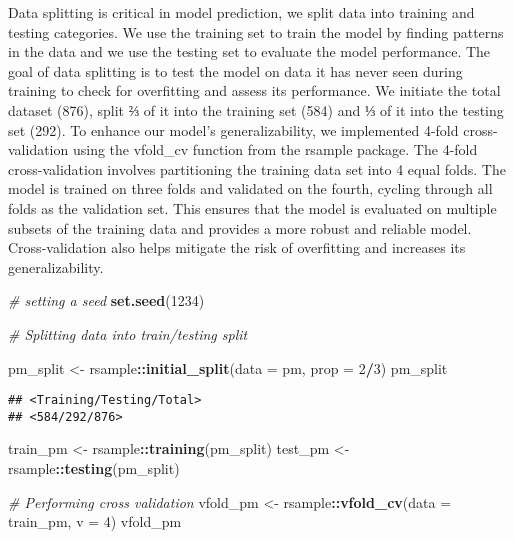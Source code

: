\documentclass[
]{article}
\newenvironment{Shaded}{\begin{snugshade}}{\end{snugshade}}
\newcommand{\AttributeTok}[1]{\textcolor[rgb]{0.13,0.29,0.53}{#1}}
\newcommand{\CommentTok}[1]{\textcolor[rgb]{0.56,0.35,0.01}{\textit{#1}}}
\newcommand{\DecValTok}[1]{\textcolor[rgb]{0.00,0.00,0.81}{#1}}
\newcommand{\FunctionTok}[1]{\textcolor[rgb]{0.13,0.29,0.53}{\textbf{#1}}}
\newcommand{\NormalTok}[1]{#1}
\newcommand{\OtherTok}[1]{\textcolor[rgb]{0.56,0.35,0.01}{#1}}
\newcommand{\SpecialCharTok}[1]{\textcolor[rgb]{0.81,0.36,0.00}{\textbf{#1}}}
\begin{document}
Data splitting is critical in model prediction, we split data into
training and testing categories. We use the training set to train the
model by finding patterns in the data and we use the testing set to
evaluate the model performance. The goal of data splitting is to test
the model on data it has never seen during training to check for
overfitting and assess its performance. We initiate the total dataset
(876), split ⅔ of it into the training set (584) and ⅓ of it into the
testing set (292). To enhance our model's generalizability, we
implemented 4-fold cross-validation using the vfold\_cv function from
the rsample package. The 4-fold cross-validation involves partitioning
the training data set into 4 equal folds. The model is trained on three
folds and validated on the fourth, cycling through all folds as the
validation set. This ensures that the model is evaluated on multiple
subsets of the training data and provides a more robust and reliable
model. Cross-validation also helps mitigate the risk of overfitting and
increases its generalizability.

\begin{Shaded}
\begin{Highlighting}[]
\CommentTok{\# setting a seed}
\FunctionTok{set.seed}\NormalTok{(}\DecValTok{1234}\NormalTok{)}

\CommentTok{\# Splitting data into train/testing split}

\NormalTok{pm\_split }\OtherTok{\textless{}{-}}\NormalTok{ rsample}\SpecialCharTok{::}\FunctionTok{initial\_split}\NormalTok{(}\AttributeTok{data =}\NormalTok{ pm, }\AttributeTok{prop =} \DecValTok{2}\SpecialCharTok{/}\DecValTok{3}\NormalTok{)}
\NormalTok{pm\_split}
\end{Highlighting}
\end{Shaded}

\begin{verbatim}
## <Training/Testing/Total>
## <584/292/876>
\end{verbatim}

\begin{Shaded}
\begin{Highlighting}[]
\NormalTok{train\_pm }\OtherTok{\textless{}{-}}\NormalTok{ rsample}\SpecialCharTok{::}\FunctionTok{training}\NormalTok{(pm\_split)}
\NormalTok{test\_pm }\OtherTok{\textless{}{-}}\NormalTok{ rsample}\SpecialCharTok{::}\FunctionTok{testing}\NormalTok{(pm\_split)}
 
\CommentTok{\# Performing cross validation}
\NormalTok{vfold\_pm }\OtherTok{\textless{}{-}}\NormalTok{ rsample}\SpecialCharTok{::}\FunctionTok{vfold\_cv}\NormalTok{(}\AttributeTok{data =}\NormalTok{ train\_pm, }\AttributeTok{v =} \DecValTok{4}\NormalTok{)}
\NormalTok{vfold\_pm}
\end{Highlighting}
\end{Shaded}
\end{document}

